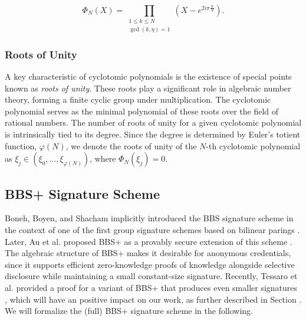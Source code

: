 \begin{equation}
\label{eq:prelim_cyclotomic_poly}
\Phi_N(X)=\prod_{\substack{1 \leq k \leq N \\ \operatorname{gcd}(k, \eta)=1}}\left(X-e^{2 i \pi \frac{k}{N}}\right).
\end{equation}

\subsubsection{Roots of Unity}
A key characteristic of cyclotomic polynomials is the existence of special points known as \textit{roots of unity}. These roots play a significant role in algebraic number theory, forming a finite cyclic group under multiplication. The cyclotomic polynomial serves as the minimal polynomial of these roots over the field of rational numbers. The number of roots of unity for a given cyclotomic polynomial is intrinsically tied to its degree. Since the degree is determined by Euler's totient function, $\varphi(N)$, we denote the roots of unity of the $N$-th cyclotomic polynomial as $\xi_j \in (\xi_0, \ldots, \xi_{\varphi(N)})$, where $\Phi_N(\xi_j) = 0$. 


\subsection{BBS+ Signature Scheme}
\label{subsec:prelim_bbs}
Boneh, Boyen, and Shacham implicitly introduced the BBS signature scheme in the context of one of the first group signature schemes based on bilinear parings \cite{boneh2004short}. Later, Au et al. proposed BBS+ as a provably secure extension of this scheme \cite{au2006constant}. The algebraic structure of BBS+ makes it desirable for anonymous credentials, since it supports efficient zero-knowledge proofs of knowledge alongside selective disclosure while maintaining a small constant-size signature. Recently, Tessaro et al. provided a proof for a variant of BBS+ that produces even smaller signatures \cite{tessaro2023revisiting}, which will have an positive impact on our work, as further described in Section \todo. We will formalize the (full) BBS+ signature scheme in the following.

